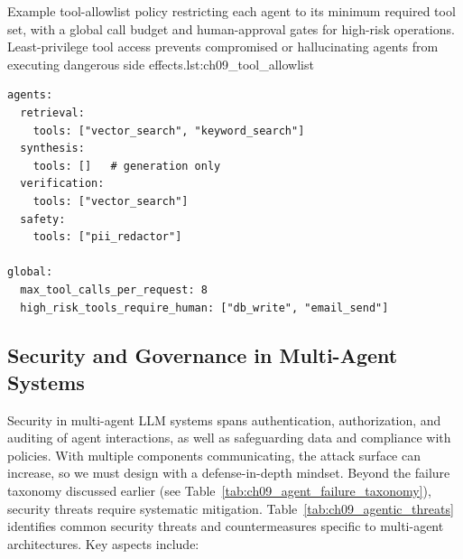\begin{codebox}{Example tool-allowlist policy restricting each agent to its minimum required tool set, with a global call budget and human-approval gates for high-risk operations. Least-privilege tool access prevents compromised or hallucinating agents from executing dangerous side effects.}{lst:ch09_tool_allowlist}
\begin{verbatim}
agents:
  retrieval:
    tools: ["vector_search", "keyword_search"]
  synthesis:
    tools: []   # generation only
  verification:
    tools: ["vector_search"]
  safety:
    tools: ["pii_redactor"]

global:
  max_tool_calls_per_request: 8
  high_risk_tools_require_human: ["db_write", "email_send"]
\end{verbatim}
\end{codebox}

\subsection*{Security and Governance in Multi-Agent Systems}
Security in multi-agent LLM systems spans authentication, authorization, and auditing of agent interactions, as well as safeguarding data and compliance with policies. With multiple components communicating, the attack surface can increase, so we must design with a defense-in-depth mindset. Beyond the failure taxonomy discussed earlier (see Table~\ref{tab:ch09_agent_failure_taxonomy}), security threats require systematic mitigation. Table~\ref{tab:ch09_agentic_threats} identifies common security threats and countermeasures specific to multi-agent architectures. Key aspects include:

